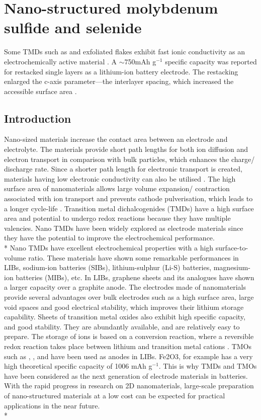 \section{Nano-structured molybdenum sulfide and selenide}
Some TMDs such as  and exfoliated  flakes exhibit fast ionic conductivity as an electrochemically active material \cite{du_superior_2010,whittingham_electrical_1976}. A $\sim$750mAh g$^{-1}$ specific capacity was reported for restacked  single layers as a lithium-ion battery electrode. The restacking enlarged the c-axis parameter—the interlayer spacing, which increased the accessible surface area \cite{ammundsen_novel_2001}.
\subsection{Introduction}
Nano-sized materials increase the contact area between an electrode and electrolyte. The materials provide short path lengths for both ion diffusion and electron transport in comparison with bulk particles, which enhances the charge/ discharge rate. Since a shorter path length for electronic transport is created, materials having low electronic conductivity can also be utilised \cite{pitchai_nanostructured_2011}. The high surface area of nanomaterials allows large volume expansion/ contraction associated with ion transport and prevents cathode pulverisation, which leads to a longer cycle-life \cite{zhang_ultrathin_2015, cong_intrinsic_2015}. Transition metal dichalcogenides (TMDs) have a high surface area and potential to undergo redox reactions because they have multiple valencies. Nano TMDs have been widely explored as electrode materials since they have the potential to improve the electrochemical performance.  \\*
Nano TMDs have excellent electrochemical properties with a high surface-to-volume ratio. These materials have shown some remarkable performances in LIBs, sodium-ion batteries (SIBs), lithium-sulphur (Li-S) batteries, magnesium-ion batteries (MIBs), etc. In LIBs, graphene sheets and its analogues have shown a larger capacity over a graphite anode. The electrodes made of nanomaterials provide several advantages over bulk electrodes such as a high surface area, large void spaces and good electrical stability, which improves their lithium storage capability. Sheets of transition metal oxides also exhibit high specific capacity, and good stability. They are abundantly available, and are relatively easy to prepare. The storage of  ions is based on a conversion reaction, where a reversible redox reaction takes place between lithium and transition metal cations \cite{reddy_metal_2013}. TMOs such as , ,  and  have been used as anodes in LIBs. Fe2O3, for example has a very high theoretical specific capacity of 1006 mAh g$^{-1}$. This is why TMDs and TMOs have been considered as the next generation of electrode materials in batteries. With the rapid progress in research on 2D nanomaterials, large-scale preparation of nano-structured materials at a low cost can be expected for practical applications in the near future. \\*

